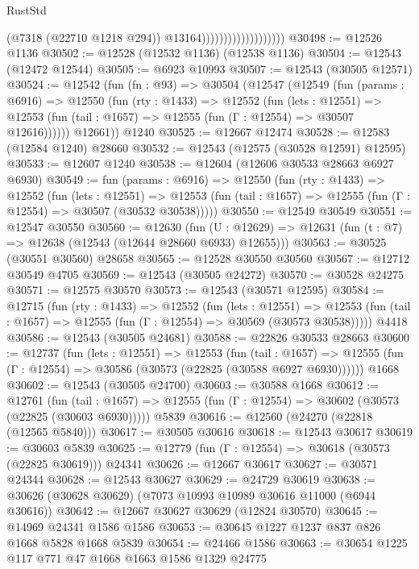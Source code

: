\begin{lexlean}{RustStd}
\begin{coremodule}
                                          (@7318 (@22710 @1218 @294))
                                          @13164)))))))))))))))))))
@30498 := @12526 @1136
@30502 := @12528 (@12532 @1136) (@12538 @1136)
@30504 := @12543 (@12472 @12544)
@30505 := @6923 @10993
@30507 := @12543 (@30505 @12571)
@30524 := @12542
    (fun (fn : @93) =>
    @30504
      (@12547
        (@12549
          (fun (params : @6916) =>
          @12550
            (fun (rty : @1433) =>
            @12552
              (fun (lets : @12551) =>
              @12553 (fun (tail : @1657) => @12555 (fun (Γ : @12554) => @30507 @12616))))))
        @12661))
    @1240
@30525 := @12667 @12474
@30528 := @12583 (@12584 @1240) @28660
@30532 := @12543 (@12575 (@30528 @12591) @12595)
@30533 := @12607 @1240
@30538 := @12604 (@12606 @30533 @28663 @6927 @6930)
@30549 := fun (params : @6916) =>
  @12550
    (fun (rty : @1433) =>
    @12552
      (fun (lets : @12551) =>
      @12553 (fun (tail : @1657) => @12555 (fun (Γ : @12554) => @30507 (@30532 @30538)))))
@30550 := @12549 @30549
@30551 := @12547 @30550
@30560 := @12630
    (fun (U : @12629) => @12631 (fun (t : @7) => @12638 (@12543 (@12644 @28660 @6933) @12655)))
@30563 := @30525 (@30551 @30560) @28658
@30565 := @12528 @30550 @30560
@30567 := @12712 @30549 @4705
@30569 := @12543 (@30505 @24272)
@30570 := @30528 @24275
@30571 := @12575 @30570
@30573 := @12543 (@30571 @12595)
@30584 := @12715
    (fun (rty : @1433) =>
    @12552
      (fun (lets : @12551) =>
      @12553 (fun (tail : @1657) => @12555 (fun (Γ : @12554) => @30569 (@30573 @30538)))))
    @4418
@30586 := @12543 (@30505 @24681)
@30588 := @22826 @30533 @28663
@30600 := @12737
    (fun (lets : @12551) =>
    @12553
      (fun (tail : @1657) =>
      @12555 (fun (Γ : @12554) => @30586 (@30573 (@22825 (@30588 @6927 @6930))))))
    @1668
@30602 := @12543 (@30505 @24700)
@30603 := @30588 @1668
@30612 := @12761
    (fun (tail : @1657) => @12555 (fun (Γ : @12554) => @30602 (@30573 (@22825 (@30603 @6930)))))
    @5839
@30616 := @12560 (@24270 (@22818 (@12565 @5840)))
@30617 := @30505 @30616
@30618 := @12543 @30617
@30619 := @30603 @5839
@30625 := @12779 (fun (Γ : @12554) => @30618 (@30573 (@22825 @30619))) @24341
@30626 := @12667 @30617
@30627 := @30571 @24344
@30628 := @12543 @30627
@30629 := @24729 @30619
@30638 := @30626 (@30628 @30629) (@7073 @10993 @10989 @30616 @11000 (@6944 @30616))
@30642 := @12667 @30627 @30629 (@12824 @30570)
@30645 := @14969 @24341 @1586 @1586
@30653 := @30645 @1227 @1237 @837 @826 @1668 @5828 @1668 @5839
@30654 := @24466 @1586
@30663 := @30654 @1225 @117 @771 @47 @1668 @1663 @1586 @1329 @24775

\end{coremodule}
\end{lexlean}
